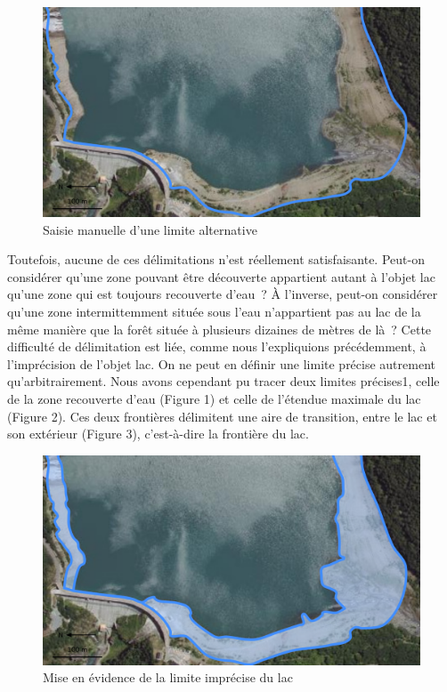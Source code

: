 \begin{figure}
  \centering
  \includegraphics{../figures/fig2.png}
  \caption{Saisie manuelle d'une limite alternative}
  \label{fig:lim_champ_alt}
\end{figure}

Toutefois, aucune de ces délimitations n’est réellement
satisfaisante. Peut-on considérer qu’une zone pouvant être découverte
appartient autant à l’objet lac qu’une zone qui est toujours
recouverte d’eau ? À l’inverse, peut-on considérer qu’une zone
intermittemment située sous l’eau n’appartient pas au lac de la même
manière que la forêt située à plusieurs dizaines de mètres de là ?
Cette difficulté de délimitation est liée, comme nous l’expliquions
précédemment, à l’imprécision de l’objet lac. On ne peut en définir
une limite précise autrement qu’arbitrairement. Nous avons cependant
pu tracer deux limites précises1, celle de la zone recouverte d’eau
(Figure 1) et celle de l’étendue maximale du lac (Figure 2). Ces deux
frontières délimitent une aire de transition, entre le lac et son
extérieur (Figure 3), c’est-à-dire la frontière du lac.

\begin{figure}
  \centering
  \includegraphics{../figures/fig3.png}
  \caption{Mise en évidence de la limite imprécise du lac}
  \label{fig:lim_champ_imp}
\end{figure}

